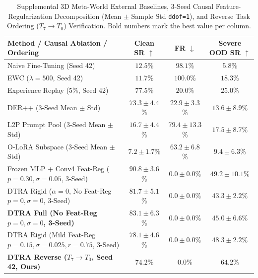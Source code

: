 \documentclass[10pt]{article}
\newcommand{\tblfont}{\fontsize{8.5pt}{10.4pt}\selectfont}
\begin{document}
\begin{table}[ht!]
  \centering
  \caption{Supplemental 3D Meta-World External Baselines, 3-Seed Causal Feature-Regularization Decomposition (Mean $\pm$ Sample Std \texttt{ddof=1}), and Reverse Task Ordering ($T_7 \to T_0$) Verification. Bold numbers mark the best value per column.}
  \label{tab:mw_supp}
  \tblfont
  \setlength{\tabcolsep}{5pt}
  \begin{tabular}{lccc}
    \toprule
    \textbf{Method / Causal Ablation / Ordering} & \textbf{Clean SR $\uparrow$} & \textbf{FR $\downarrow$} & \textbf{Severe OOD SR $\uparrow$} \\
    \midrule
    Naive Fine-Tuning (Seed 42) & $12.5$\% & $98.1$\% & $5.8$\% \\
    EWC ($\lambda=500$, Seed 42) & $11.7$\% & $100.0$\% & $18.3$\% \\
    Experience Replay (5\%, Seed 42) & $77.5$\% & $20.0$\% & $25.0$\% \\
    DER++ (3-Seed Mean $\pm$ Std) & $73.3 \pm 4.4$\% & $22.9 \pm 3.3$\% & $13.6 \pm 8.9$\% \\
    L2P Prompt Pool (3-Seed Mean $\pm$ Std) & $16.7 \pm 4.4$\% & $79.4 \pm 13.3$\% & $17.5 \pm 8.7$\% \\
    O-LoRA Subspace (3-Seed Mean $\pm$ Std) & $7.2 \pm 1.7$\% & $63.2 \pm 6.8$\% & $9.4 \pm 6.3$\% \\
    \midrule
    Frozen MLP + Conv4 Feat-Reg ($p=0.30,\sigma=0.05$, 3-Seed) & $\mathbf{90.8 \pm 3.6}$\% & $\mathbf{0.0 \pm 0.0}$\% & $49.2 \pm 10.1$\% \\
    DTRA Rigid ($\alpha=0$, No Feat-Reg $p=0,\sigma=0$, 3-Seed) & $81.7 \pm 5.1$\% & $\mathbf{0.0 \pm 0.0}$\% & $43.3 \pm 2.2$\% \\
    \textbf{DTRA Full (No Feat-Reg $p=0,\sigma=0$, 3-Seed)} & $83.1 \pm 6.3$\% & $\mathbf{0.0 \pm 0.0}$\% & $45.0 \pm 6.6$\% \\
    DTRA Rigid (Mild Feat-Reg $p=0.15,\sigma=0.025,r=0.75$, 3-Seed) & $78.1 \pm 4.6$\% & $\mathbf{0.0 \pm 0.0}$\% & $48.3 \pm 2.2$\% \\
    \textbf{DTRA Reverse ($T_7 \to T_0$, Seed 42, Ours)} & $74.2$\% & $\mathbf{0.0}$\% & $\mathbf{64.2}$\% \\
    \bottomrule
  \end{tabular}
\end{table}
\end{document}
